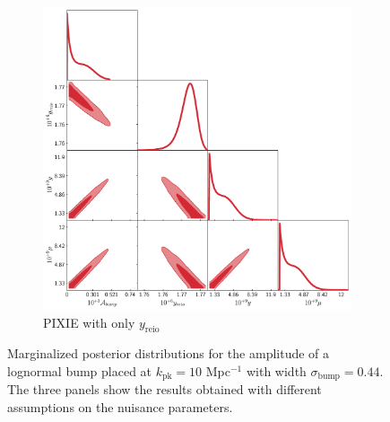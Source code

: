 \begin{figure}
    \vspace{1em}

    \begin{subfigure}{0.5\textheight}
        \centering
        \includegraphics[width=1\textwidth]{Constraints/LN_NN_reio.pdf}
        \caption{PIXIE with only $y_\text{reio}$}
        \label{fig:LN_NN_reio}        
    \end{subfigure}
    \caption{Marginalized posterior distributions for the amplitude of a lognormal bump placed at $k_\text{pk}=10$ Mpc$^{-1}$ with width $\sigma_\text{bump}=0.44$. The three panels show the results obtained with different assumptions on the nuisance parameters.}
    \label{fig:LN_all}
\end{figure}

